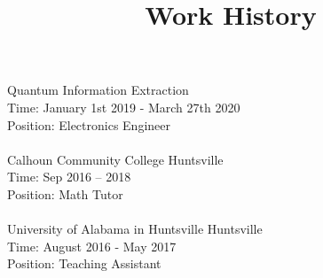 \documentclass[]{article}
\title{Work History}
\begin{document}
\maketitle
\noindent
Quantum Information Extraction \\
Time: January 1st 2019 - March 27th 2020 \\ 
Position: Electronics Engineer \\ \\
Calhoun Community College Huntsville
\\
Time: Sep 2016 – 2018 \\
Position:  Math Tutor
\\ \\
University of Alabama in Huntsville Huntsville
\\
Time: August 2016 - May 2017 \\
Position: Teaching Assistant
 \\ \\
\end{document}
